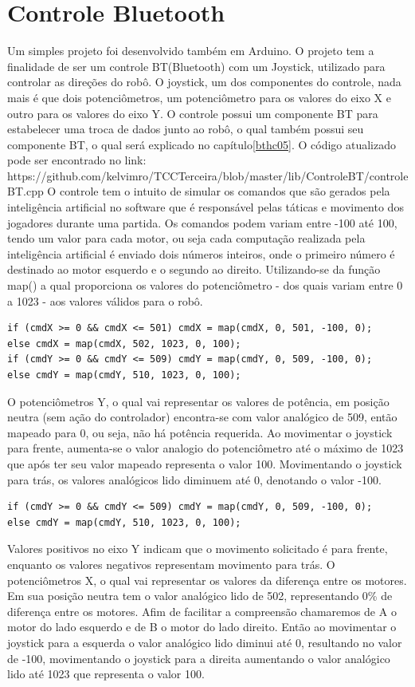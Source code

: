 \documentclass[a4paper,12pt,portuguese]{ufms-cpcx}
\begin{document}
\chapter{Controle Bluetooth}
Um simples projeto foi desenvolvido também em Arduino. O projeto tem a finalidade de ser um controle BT(Bluetooth) com um Joystick, utilizado para controlar as direções do robô. 
O joystick, um dos componentes do controle, nada mais é que dois potenciômetros, um potenciômetro para os valores do eixo X e outro para os valores do eixo Y. 
O controle possui um componente BT para estabelecer uma troca de dados junto ao robô, o qual também possui seu componente BT, o qual será explicado no capítulo\ref{bthc05}.
O código atualizado pode ser encontrado no link: https://github.com/kelvimro/TCCTerceira/blob/master/lib/ControleBT/controleBT.cpp 
O controle tem o intuito de simular os comandos que são gerados pela inteligência artificial no software que é responsável pelas táticas e movimento dos jogadores durante uma partida.
Os comandos podem variam entre -100 até 100, tendo um valor para cada motor, ou seja cada computação realizada pela inteligência artificial é enviado dois números inteiros, onde o primeiro número é destinado ao motor esquerdo e o segundo ao direito.
Utilizando-se da função map() a qual proporciona os valores do potenciômetro - dos quais variam entre 0 a 1023 - aos valores válidos para o robô.
\begin{lstlisting}
if (cmdX >= 0 && cmdX <= 501) cmdX = map(cmdX, 0, 501, -100, 0);
else cmdX = map(cmdX, 502, 1023, 0, 100);
if (cmdY >= 0 && cmdY <= 509) cmdY = map(cmdY, 0, 509, -100, 0);
else cmdY = map(cmdY, 510, 1023, 0, 100);
\end{lstlisting}
O potenciômetros Y, o qual vai representar os valores de potência, em posição neutra (sem ação do controlador) encontra-se com valor analógico de 509, então mapeado para 0, ou seja, não há potência requerida.
Ao movimentar o joystick para frente, aumenta-se o valor analogio do potenciômetro até o máximo de 1023 que após ter seu valor mapeado representa o valor 100.
Movimentando o joystick para trás, os valores analógicos lido diminuem até 0, denotando o valor -100. 
\begin{lstlisting}
if (cmdY >= 0 && cmdY <= 509) cmdY = map(cmdY, 0, 509, -100, 0);
else cmdY = map(cmdY, 510, 1023, 0, 100);
\end{lstlisting}
Valores positivos no eixo Y indicam que o movimento solicitado é para frente, enquanto os valores negativos representam movimento para trás.
O potenciômetros X, o qual vai representar os valores da diferença entre os motores. Em sua posição neutra tem o valor analógico lido de 502, representando 0\% de diferença entre os motores. Afim de facilitar a compreensão chamaremos de A o motor do lado esquerdo e de B o motor do lado direito. Então ao movimentar o joystick para a esquerda o valor analógico lido diminui até 0, resultando no valor de -100, movimentando o joystick para a direita aumentando o valor analógico lido até 1023 que representa o valor 100. 
\end{document}

